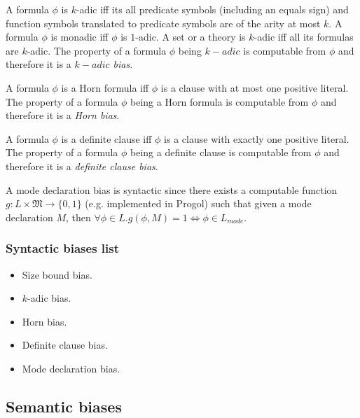 \begin{defn}
A formula $\phi$ is $k$-adic iff its all predicate symbols (including an equals sign) and function symbols translated to predicate symbols are of the arity at most $k$. A formula $\phi$ is monadic iff $\phi$ is $1$-adic. A set or a theory is $k$-adic iff all its formulas are $k$-adic. The property of a formula $\phi$ being $k-adic$ is computable from $\phi$ and therefore it is a \emph{$k-adic$ bias}.
\end{defn}

\begin{defn}
A formula $\phi$ is a Horn formula iff $\phi$ is a clause with at most one positive literal. The property of a formula $\phi$ being a Horn formula is computable from $\phi$ and therefore it is a \emph{Horn bias}.
\end{defn}

\begin{defn}
A formula $\phi$ is a definite clause iff $\phi$ is a clause with exactly one positive literal. The property of a formula $\phi$ being a definite clause is computable from $\phi$ and therefore it is a \emph{definite clause bias}.
\end{defn}

\begin{remark}
A mode declaration bias is syntactic since there exists a computable function $g:L \times \mathfrak{M} \to \{0, 1\}$ (e.g. implemented in Progol\cite{muggleton1995inverse}) such that given a mode declaration $M$, then
$\forall \phi \in L. g(\phi, M)=1 \iff \phi \in L_{mode}$.
\end{remark}

\subsubsection{Syntactic biases list}
\begin{itemize}
\item Size bound bias.
\item $k$-adic bias.
\item Horn bias.
\item Definite clause bias.
\item Mode declaration bias.
\end{itemize}

\subsection{Semantic biases}

